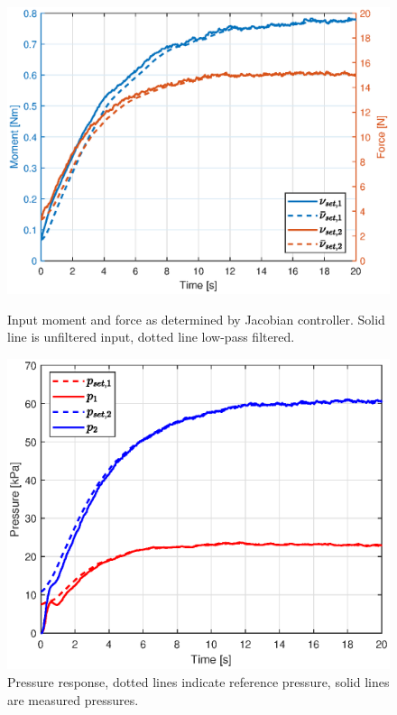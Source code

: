 \begin{figure}[H] 
    \begin{minipage}[b]{0.49\linewidth}
     \centering
    \includegraphics[width=\linewidth]{Figures/Chapter5/nuright.eps} 
    \caption{Input moment and force as determined by Jacobian controller. Solid line is unfiltered input, dotted line low-pass filtered. } 
    \label{fig3:dim} 
       \end{minipage} 
    \begin{minipage}[b]{0.49\linewidth}
     \centering
    \includegraphics[width=\linewidth]{Figures/Chapter5/pressureright.eps} 
    \caption{Pressure response, dotted lines indicate reference pressure, solid lines are measured pressures.} 
    \label{fig3:FemModel} 
    \end{minipage} 
\end{figure}






